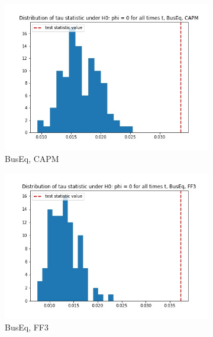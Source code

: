 \documentclass{article}
\begin{document}
    \begin{figure}
    \centering
  \begin{subfigure}[b]{0.3\textwidth}
    \centering
    \includegraphics[width=\textwidth]{BusEq/tau_hist_02_CAPM.jpg}
    \caption{BusEq, CAPM}
    \label{fig:1}
  \end{subfigure}
  \begin{subfigure}[b]{0.3\textwidth}
    \centering
    \includegraphics[width=\textwidth]{BusEq/tau_hist_02_FF3.jpg}
    \caption{BusEq, FF3}
    \label{fig:2}
  \end{subfigure}
    \begin{subfigure}[b]{0.3\textwidth}
    \centering

\end{subfigure}
\end{figure}
\end{document}
